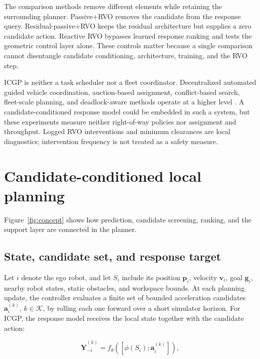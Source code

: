 \documentclass[pdflatex,sn-mathphys-num]{sn-jnl}
\begin{document}
The comparison methods remove different elements while retaining the surrounding planner. Passive+RVO removes the candidate from the response query. Residual-passive+RVO keeps the residual architecture but supplies a zero candidate action. Reactive RVO bypasses learned response ranking and tests the geometric control layer alone. These controls matter because a single comparison cannot disentangle candidate conditioning, architecture, training, and the RVO step.

ICGP is neither a task scheduler nor a fleet coordinator. Decentralized automated guided vehicle coordination, auction-based assignment, conflict-based search, fleet-scale planning, and deadlock-aware methods operate at a higher level \cite{draganjac2016,bai2023,ren2021mapf,leet2023,ma2019,zhang2025,deadlock2025}. A candidate-conditioned response model could be embedded in such a system, but these experiments measure neither right-of-way policies nor assignment and throughput. Logged RVO interventions and minimum clearances are local diagnostics; intervention frequency is not treated as a safety measure.
\section{Candidate-conditioned local planning}
\label{sec:method}

Figure~\ref{fig:concept} shows how prediction, candidate screening, ranking, and the support layer are connected in the planner.

\subsection{State, candidate set, and response target}

Let $i$ denote the ego robot, and let $S_i$ include its position $\mathbf{p}_i$, velocity $\mathbf{v}_i$, goal $\mathbf{g}_i$, nearby robot states, static obstacles, and workspace bounds. At each planning update, the controller evaluates a finite set of bounded acceleration candidates $\mathbf{a}_i^{(k)}$, $k\in\mathcal{K}$, by rolling each one forward over a short simulator horizon. For ICGP, the response model receives the local state together with the candidate action:

\begin{equation}
\widehat{\mathbf{Y}}_{-i}^{(k)}=f_{\theta}\!\left(\left[\phi(S_i);\mathbf{a}_i^{(k)}\right]\right),
\label{eq:response}
\end{equation}
\end{document}
